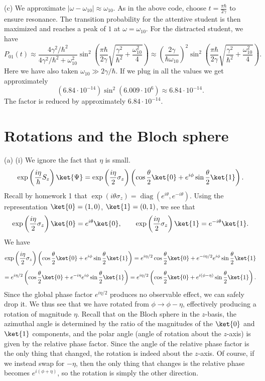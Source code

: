 \documentclass[11pt, letterpaper]{article}
\begin{document}
(c) We approximate $\left| \omega -\omega _{10}  \right| \approx \omega _{10} $. As in the above code, choose $t=\frac{\pi \hbar}{2\gamma } $ to ensure resonance. The transition probability for the attentive student is then maximized and reaches a peak of $1$ at $\omega =\omega_{10} $. For the distracted student, we have
\[
	P_{01} (t)\approx \frac{4\gamma ^2/\hbar^2}{4\gamma ^2/\hbar^2+\omega_{10} ^2} \sin ^2\left( \frac{\pi \hbar}{2\gamma } \sqrt{\frac{\gamma ^2}{\hbar^2} +\frac{\omega_{10} ^2}{4} }  \right) \approx \left( \frac{2\gamma }{\hbar\omega _{10} }  \right) ^2 \sin ^2\left( \frac{\pi \hbar}{2\gamma } \sqrt{\frac{\gamma ^2}{\hbar^2} +\frac{\omega _{10} ^2}{4} }  \right) 
.\]
Here we have also taken $\omega _{10 } \gg 2\gamma /\hbar$. If we plug in all the values we get approximately
\[
	\left( 6.84\cdot 10^{-14}  \right) \sin ^2\left( 6.009\cdot 10^6 \right) \approx 6.84\cdot 10^{-14} 
.\]
The factor is reduced by approximately $6.84\cdot 10^{-14} $.


\section{Rotations and the Bloch sphere}

(a) (i) We ignore the fact that $\eta $ is small.
\[
	\exp \left( \frac{i\eta }{\hbar} S_z \right) \ket{\Psi }=\exp \left( \frac{i\eta }{2} \sigma _z \right) \left( \cos \frac{\theta }{2} \ket{0}+ e^{i\phi } \sin \frac{\theta }{2} \ket{1} \right) 
.\]
Recall by homework 1 that $\exp (i\theta \sigma _z)=\operatorname{diag} (e^{i\theta } ,e^{-i\theta } )$. Using the representation $\ket{0}=(1,0)$, $\ket{1}=(0,1)$, we see that
\[
	\exp \left( \frac{i\eta }{2}\sigma _z \right) \ket{0}=e^{i\theta } \ket{0},\qquad \exp \left( \frac{i\eta }{2} \sigma _z \right) \ket{1}=e^{-i\theta } \ket{1}
.\]
We have
\[
	\exp \left( \frac{i\eta }{2} \sigma _z \right) \left( \cos \frac{\theta }{2} \ket{0}+ e^{i\phi } \sin \frac{\theta }{2} \ket{1} \right) = e^{i\eta /2} \cos \frac{\theta }{2} \ket{0}+e^{-i\eta /2} e^{i\phi } \sin \frac{\theta }{2} \ket{1}
\]
\[
	=e^{i\eta /2} \left( \cos \frac{\theta }{2} \ket{0}+e^{-i\eta } e^{i\phi } \sin \frac{\theta }{2} \ket{1} \right) =e^{i\eta /2} \left( \cos \frac{\theta }{2} \ket{0}+e^{i(\phi -\eta )} \sin \frac{\theta }{2} \ket{1} \right) 
.\]
Since the global phase factor $e^{i\eta /2} $ produces no observable effect, we can safely drop it. We thus see that we have rotated from $\phi \to \phi -\eta $, effectively producing a rotation of magnitude $\eta $. Recall that on the Bloch sphere in the $z$-basis, the azimuthal angle is determined by the ratio of the magnitudes of the $\ket{0}$ and $\ket{1}$ components, and the polar angle (angle of rotation about the $z$-axis) is given by the relative phase factor. Since the angle of the relative phase factor is the only thing that changed, the rotation is indeed about the $z$-axis. Of course, if we instead swap for $-\eta $, then the only thing that changes is the relative phase becomes $e^{i(\phi +\eta )} $, so the rotation is simply the other direction.
\end{document}

